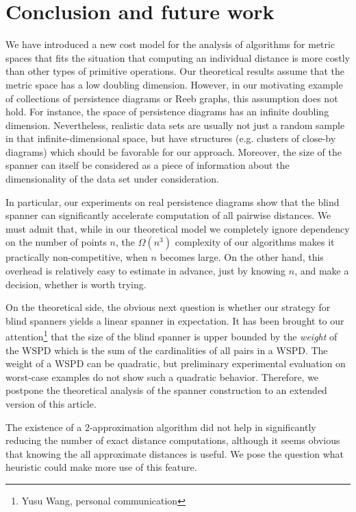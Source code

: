 \documentclass[]{ws-ijcga}
\begin{document}
\section{Conclusion and future work}
\label{sec:conclusion}
%
We have introduced a new cost model for the analysis of algorithms
for metric spaces that fits the situation that computing an individual distance
is more costly than other types of primitive operations.
Our theoretical results assume
that the metric space has a low doubling dimension.
However, in our motivating example of collections of persistence diagrams
or Reeb graphs, this assumption does not hold. For instance,
the space of persistence diagrams has an infinite doubling dimension.
Nevertheless, realistic data sets are usually not just a random sample
in that infinite-dimensional space, but have structures
(e.g. clusters of close-by diagrams) which should be favorable for our approach.
Moreover, the size of the \bgrdy spanner can itself be considered as a piece
of information about the dimensionality of the data set under consideration.


In particular, our experiments on real persistence diagrams
show that the blind spanner can significantly accelerate
computation of all pairwise distances. We must admit that,
while in our theoretical model we completely ignore dependency on the number of points $n$,
the $\Omega(n^3)$ complexity of our algorithms makes it practically
non-competitive, when $n$ becomes large.
On the other hand, this overhead is relatively easy to estimate
in advance, just by knowing $n$, and make a decision,
whether \bgrdy is worth trying. 


On the theoretical side, the obvious next question is whether our strategy
for blind spanners yields a linear spanner in expectation. 
It has been brought to our attention\footnote{Yusu Wang, personal communication}
that the size of the blind spanner is upper bounded by the \emph{weight} of the WSPD
which is the sum of the  cardinalities of all pairs in a WSPD.
The weight of a WSPD can be quadratic, but preliminary
experimental evaluation on worst-case examples do not show such a quadratic
behavior. Therefore, we postpone the theoretical analysis of the spanner construction
to an extended version of this article.

The existence of a $2$-approximation algorithm did not help in significantly
reducing the number of exact distance computations, although it seems obvious
that knowing the all approximate distances is useful.
We pose the question what heuristic could make more use of this feature.
\end{document}
